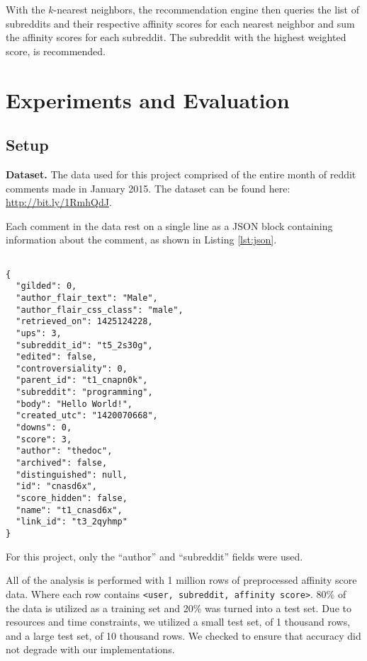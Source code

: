 \documentclass[conference, 12pt]{IEEEtran}
\begin{document}
With the $k$-nearest neighbors, the recommendation engine then queries the list of subreddits and their respective affinity scores for each nearest neighbor and sum the affinity scores for each subreddit. The subreddit with the highest weighted score, is recommended.



\section{Experiments and Evaluation}
\subsection{Setup}

\textbf{Dataset.} The data used for this project comprised of the entire month of reddit comments made in January 2015.  The dataset can be found here: \url{http://bit.ly/1RmhQdJ}.

Each comment in the data rest on a single line as a JSON block containing information about the comment, as shown in Listing \ref{lst:json}.  

\tiny
\begin{lstlisting}[caption={Example JSON block},captionpos=b,label={lst:json}]
 
{
  "gilded": 0,
  "author_flair_text": "Male",
  "author_flair_css_class": "male",
  "retrieved_on": 1425124228,
  "ups": 3,
  "subreddit_id": "t5_2s30g",
  "edited": false,
  "controversiality": 0,
  "parent_id": "t1_cnapn0k",
  "subreddit": "programming",
  "body": "Hello World!",
  "created_utc": "1420070668",
  "downs": 0,
  "score": 3,
  "author": "thedoc",
  "archived": false,
  "distinguished": null,
  "id": "cnasd6x",
  "score_hidden": false,
  "name": "t1_cnasd6x",
  "link_id": "t3_2qyhmp"
}

\end{lstlisting}

\normalsize
For this project, only the \enquote{author} and \enquote{subreddit} fields were used.

All of the analysis is performed with 1 million rows of preprocessed affinity score data.  Where each row contains \texttt{<user, subreddit, affinity score>}.  80\% of the data is utilized as a training set and 20\% was turned into a test set.  Due to resources and time constraints, we utilized a small test set, of 1 thousand rows, and a large test set, of 10 thousand rows. We checked to ensure that accuracy did not degrade with our implementations.
\end{document}
